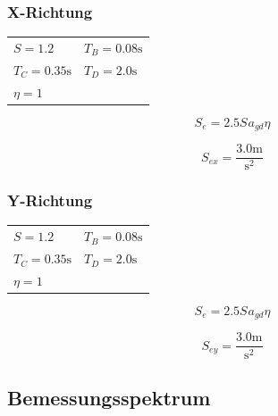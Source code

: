 \documentclass[
  letterpaper,
  DIV=11]{scrreprt}
\begin{document}
\hypertarget{x-richtung-4}{%
\subsubsection{X-Richtung}\label{x-richtung-4}}

\begin{longtable}[]{@{}
  >{\raggedright\arraybackslash}p{}
  >{\raggedright\arraybackslash}p{}@{}}
\toprule\noalign{}
\endhead
\bottomrule\noalign{}
\endlastfoot
\(S = 1.2\) & \(T_{B} = 0.08 \text{s}\) \\
\(T_{C} = 0.35 \text{s}\) & \(T_{D} = 2.0 \text{s}\) \\
\(\eta = 1\) & \\
\end{longtable}

\begin{equation}S_{e} = 2.5 S_{} a_{gd} \eta\end{equation}

\begin{equation}S_{e x} = \frac{3.0 \text{m}}{\text{s}^{2}}\end{equation}

\hypertarget{y-richtung-4}{%
\subsubsection{Y-Richtung}\label{y-richtung-4}}

\begin{longtable}[]{@{}
  >{\raggedright\arraybackslash}p{}
  >{\raggedright\arraybackslash}p{}@{}}
\toprule\noalign{}
\endhead
\bottomrule\noalign{}
\endlastfoot
\(S = 1.2\) & \(T_{B} = 0.08 \text{s}\) \\
\(T_{C} = 0.35 \text{s}\) & \(T_{D} = 2.0 \text{s}\) \\
\(\eta = 1\) & \\
\end{longtable}

\begin{equation}S_{e} = 2.5 S_{} a_{gd} \eta\end{equation}

\begin{equation}S_{e y} = \frac{3.0 \text{m}}{\text{s}^{2}}\end{equation}

\hypertarget{bemessungsspektrum}{%
\subsection{Bemessungsspektrum}\label{bemessungsspektrum}}
\end{document}
